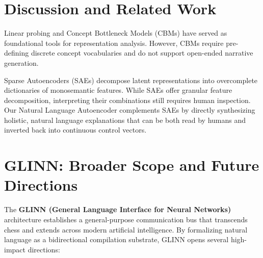 \documentclass[10pt,twocolumn]{article}
\begin{document}
\section{Discussion and Related Work}
Linear probing \cite{alain2016understanding} and Concept Bottleneck Models (CBMs) \cite{koh2020concept} have served as foundational tools for representation analysis. However, CBMs require pre-defining discrete concept vocabularies and do not support open-ended narrative generation.

Sparse Autoencoders (SAEs) \cite{cunningham2023sparse} decompose latent representations into overcomplete dictionaries of monosemantic features. While SAEs offer granular feature decomposition, interpreting their combinations still requires human inspection. Our Natural Language Autoencoder complements SAEs by directly synthesizing holistic, natural language explanations that can be both read by humans and inverted back into continuous control vectors.

\section{GLINN: Broader Scope and Future Directions}
The \textbf{GLINN (General Language Interface for Neural Networks)} architecture establishes a general-purpose communication bus that transcends chess and extends across modern artificial intelligence. By formalizing natural language as a bidirectional compilation substrate, GLINN opens several high-impact directions:
\end{document}
